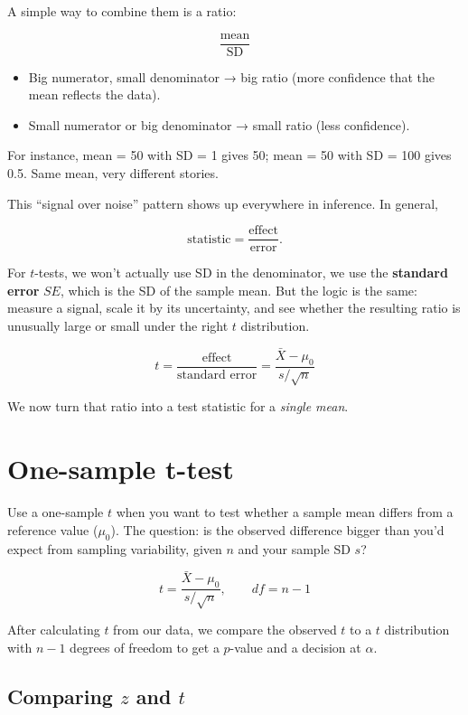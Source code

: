 \documentclass[
  letterpaper,
  DIV=11,
  numbers=noendperiod]{scrreprt}
\begin{document}
A simple way to combine them is a ratio:

\[
\frac{\text{mean}}{\text{SD}}
\]

\begin{itemize}
\item
  Big numerator, small denominator → big ratio (more confidence that the
  mean reflects the data).
\item
  Small numerator or big denominator → small ratio (less confidence).
\end{itemize}

For instance, mean = 50 with SD = 1 gives 50; mean = 50 with SD = 100
gives 0.5. Same mean, very different stories.

This ``signal over noise'' pattern shows up everywhere in inference. In
general,

\[
\text{statistic}=\frac{\text{effect}}{\text{error}}.
\]

For \(t\)-tests, we won't actually use SD in the denominator, we use the
\textbf{standard error} \(SE\), which is the SD of the sample mean. But
the logic is the same: measure a signal, scale it by its uncertainty,
and see whether the resulting ratio is unusually large or small under
the right \(t\) distribution.

\[
t = \frac{\text{effect}}{\text{standard error}} = \frac{\bar{X} - \mu_0}{s / \sqrt{n}}
\]

We now turn that ratio into a test statistic for a \emph{single mean}.

\section{One-sample t-test}\label{one-sample-t-test}

Use a one-sample \(t\) when you want to test whether a sample mean
differs from a reference value (\(\mu_0\)). The question: is the
observed difference bigger than you'd expect from sampling variability,
given \(n\) and your sample SD \(s\)?

\[
t = \frac{\bar{X}-\mu_0}{s/\sqrt{n}}, \qquad df = n-1
\]

After calculating \(t\) from our data, we compare the observed \(t\) to
a \(t\) distribution with \(n-1\) degrees of freedom to get a
\(p\)-value and a decision at \(\alpha\).

\subsection{\texorpdfstring{Comparing \(z\) and
\(t\)}{Comparing z and t}}\label{comparing-z-and-t}
\end{document}
